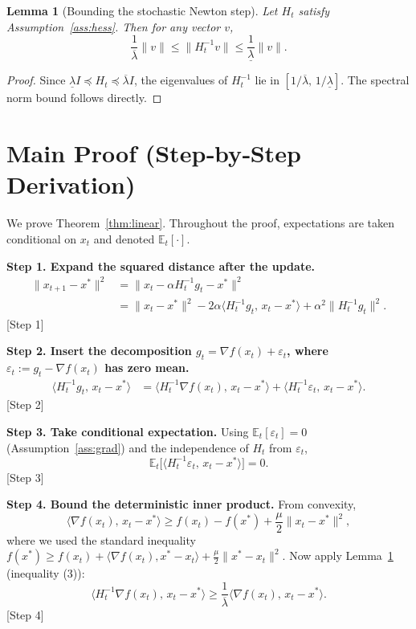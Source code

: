 \documentclass{article}
\newtheorem{lemma}{Lemma}
\begin{document}
\begin{lemma}[Bounding the stochastic Newton step]\label{lem:step}
Let $H_{t}$ satisfy Assumption~\ref{ass:hess}.  Then for any vector $v$,
\[
\frac{1}{\overline{\lambda}}\|v\|\le\|H_{t}^{-1}v\|\le\frac{1}{\underline{\lambda}}\|v\|.
\tag{3}
\]
\end{lemma}
\begin{proof}
Since $\underline{\lambda}I\preceq H_{t}\preceq\overline{\lambda}I$, the eigenvalues of
$H_{t}^{-1}$ lie in $[1/\overline{\lambda},\,1/\underline{\lambda}]$.  The
spectral norm bound follows directly. \hfill\qedsymbol
\end{proof}
\section*{Main Proof (Step‑by‑Step Derivation)}
We prove Theorem~\ref{thm:linear}.  Throughout the proof, expectations are
taken conditional on $x_{t}$ and denoted $\mathbb{E}_{t}[\cdot]$.

\bigskip
\noindent\textbf{Step 1. Expand the squared distance after the update.}
\begin{align}
\|x_{t+1}-x^{*}\|^{2}
&= \bigl\|x_{t}-\alpha H_{t}^{-1}g_{t}-x^{*}\bigr\|^{2} \nonumber\\
&= \|x_{t}-x^{*}\|^{2}
    -2\alpha\langle H_{t}^{-1}g_{t},\,x_{t}-x^{*}\rangle
    +\alpha^{2}\|H_{t}^{-1}g_{t}\|^{2}. \tag{4}
\end{align}
[Step 1]

\bigskip
\noindent\textbf{Step 2. Insert the decomposition $g_{t}= \nabla f(x_{t})+\varepsilon_{t}$,
where $\varepsilon_{t}:=g_{t}-\nabla f(x_{t})$ has zero mean.}
\begin{align}
\langle H_{t}^{-1}g_{t},\,x_{t}-x^{*}\rangle
&= \langle H_{t}^{-1}\nabla f(x_{t}),\,x_{t}-x^{*}\rangle
   +\langle H_{t}^{-1}\varepsilon_{t},\,x_{t}-x^{*}\rangle. \tag{5}
\end{align}
[Step 2]

\bigskip
\noindent\textbf{Step 3. Take conditional expectation.}
Using $\mathbb{E}_{t}[\varepsilon_{t}]=0$ (Assumption~\ref{ass:grad}) and the
independence of $H_{t}$ from $\varepsilon_{t}$,
\[
\mathbb{E}_{t}\bigl[\langle H_{t}^{-1}\varepsilon_{t},\,x_{t}-x^{*}\rangle\bigr]=0.
\tag{6}
\]
[Step 3]

\bigskip
\noindent\textbf{Step 4. Bound the deterministic inner product.}
From convexity,
\[
\langle \nabla f(x_{t}),\,x_{t}-x^{*}\rangle
\ge f(x_{t})-f(x^{*})+\frac{\mu}{2}\|x_{t}-x^{*}\|^{2},
\tag{7}
\]
where we used the standard inequality
$f(x^{*})\ge f(x_{t})+\langle\nabla f(x_{t}),x^{*}-x_{t}\rangle
+\frac{\mu}{2}\|x^{*}-x_{t}\|^{2}$.
Now apply Lemma~\ref{lem:step} (inequality (3)):
\[
\langle H_{t}^{-1}\nabla f(x_{t}),\,x_{t}-x^{*}\rangle
\ge \frac{1}{\overline{\lambda}}\langle \nabla f(x_{t}),\,x_{t}-x^{*}\rangle.
\tag{8}
\]
[Step 4]
\end{document}
